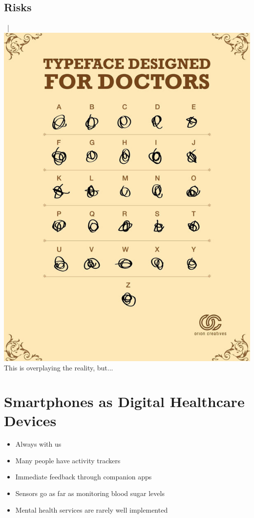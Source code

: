 \documentclass[xcolor=dvipsnames, aspectratio=1610]{beamer}
\begin{document}
\subsection{Risks}%
\label{sub:risks}

\begin{frame}{\secname\ | \subsecname}
    \centering
    \includegraphics[height=0.8\textheight]{../media/doctor_handwriting.jpg} \\
    \small{This is overplaying the reality, but...}
\end{frame}

\section{Smartphones as Digital Healthcare Devices}%
\label{sec:smartphones_as_digital_healthcare_devices}

\begin{frame}{\secname}
    \begin{itemize}[<+->]
        \item Always with us
        \item Many people have activity trackers
        \item Immediate feedback through companion apps
        \item Sensors go as far as monitoring blood sugar levels
        \item Mental health services are rarely well implemented
    \end{itemize}
\end{frame}
\end{document}
